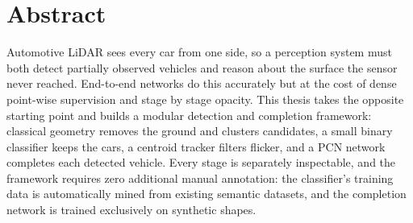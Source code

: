 %
%
\chapter*{Abstract}
\label{ch:abstract}

Automotive LiDAR sees every car from one side, so a perception system must both detect
partially observed vehicles and reason about the surface the sensor never reached.
End-to-end networks do this accurately but at the cost of dense point-wise supervision
and stage by stage opacity. This thesis takes the opposite starting point and builds a
modular detection and completion framework: classical geometry removes the ground
and clusters candidates, a small binary classifier keeps the cars, a centroid tracker
filters flicker, and a PCN network completes each detected vehicle. Every stage is
separately inspectable, and the framework requires zero additional manual annotation:
the classifier's training data is automatically mined from existing semantic datasets,
and the completion network is trained exclusively on synthetic shapes.

